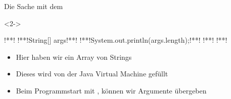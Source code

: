 \begin{frame}[fragile]{Die Sache mit dem }
\begin{uncoverenv}<2->
\begin{plainjava}[lineskip=4pt]
!**!
    !**!String[] args!**!
        !**!System.out.println(args.length);!**!
    !**!
!**!
\end{plainjava}
\end{uncoverenv}
\begin{itemize}[<+(1)->]
    \itemsep6pt
    \item<4-> Hier haben wir ein Array von Strings
    \item<5-> Dieses wird von der Java Virtual Machine gefüllt
    \item<7-> Beim Programmstart mit , können wir Argumente übergeben
\end{itemize}
\end{frame}

